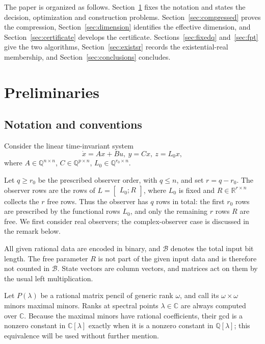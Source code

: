 \documentclass[journal]{IEEEtran}
\theoremstyle{plainn}
\theoremstyle{remark}
\begin{document}
The paper is organized as follows. Section~\ref{sec:prelim} fixes the notation and states
the decision, optimization and construction problems. Section~\ref{sec:compressed} proves
the compression, Section~\ref{sec:dimension} identifies the effective dimension, and
Section~\ref{sec:certificate} develops the certificate. Sections~\ref{sec:fixedq}
and~\ref{sec:fpt} give the two algorithms, Section~\ref{sec:existsr} records the
existential-real membership, and Section~\ref{sec:conclusions} concludes.

\section{Preliminaries}\label{sec:prelim}

\subsection{Notation and conventions}\label{sec:notation}

Consider the linear time-invariant system
\begin{equation}\label{system}
\dot{x}=Ax+Bu,\ y=Cx,\ z=L_0x,
\end{equation}
where $A\in\mathbb Q^{n\times n}$, $C\in\mathbb Q^{p\times n}$, $L_0\in\mathbb Q^{r_0\times n}$. 

Let $q\ge r_0$ be the prescribed observer order, with $q\le n$, and set $r=q-r_0$. The observer rows are the rows of $L=\begin{bmatrix}L_0; R\end{bmatrix}$, where $L_0$ is fixed and $R\in\mathbb R^{r\times n}$ collects the $r$ free rows. Thus the observer has $q$ rows in total: the first $r_0$ rows are prescribed by the functional rows $L_0$, and only the remaining $r$ rows $R$ are free. We first consider real observers; the complex-observer case is discussed in the remark below.

All given rational data are encoded in binary, and $\mathcal B$ denotes the total input bit length. The free parameter $R$ is not part of the given input data and is therefore not counted in $\mathcal B$. State vectors are column vectors, and matrices act on them by the usual left multiplication.

Let $P(\lambda)$ be a rational matrix pencil of generic rank $\omega$, and
call its $\omega\times\omega$ minors maximal minors. Ranks at spectral points
$\lambda\in\mathbb C$ are always computed over $\mathbb C$. Because the
maximal minors have rational coefficients, their gcd is a nonzero constant in
$\mathbb C[\lambda]$ exactly when it is a nonzero constant in
$\mathbb Q[\lambda]$; this equivalence will be used without further mention.
\end{document}
